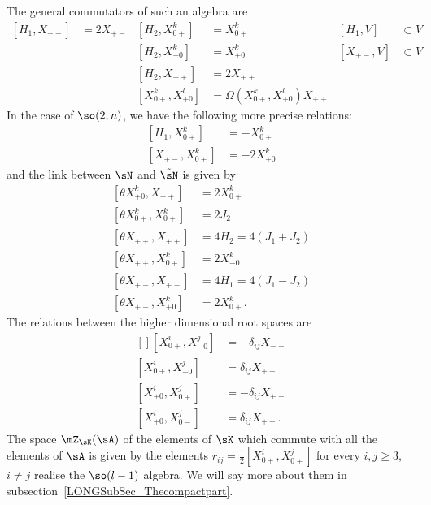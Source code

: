 The general commutators of such an algebra are
\begin{subequations}		\label{LONGsubEqsGenPySO}
\begin{align}
	[H_1,X_{+-}]		&=2X_{+-}	&	[H_2,X_{0+}^{k}]	&=X_{0+}^{k}				&[H_1,V]	&\subset V	\\
				&		&	[H_2,X_{+0}^{k}]	&=X_{+0}^{k}				&[X_{+-},V]	&\subset V	\\
				&		&	[H_2,X_{++}]		&=2X_{++}								\\
				&		&	[X_{0+}^k,X_{+0}^l]	&=\Omega(X_{0+}^k,X_{+0}^l)X_{++}
\end{align}
\end{subequations}
In the case of $\so(2,n)$, we have the following more precise relations:
\begin{subequations}		\label{LONGSubEqsPlusPresPySO}
	\begin{align}
		[H_1,X^k_{0+}]&=-X^k_{0+}\\
		[X_{+-},X^k_{0+}]&=-2X^k_{+0}
	\end{align}
\end{subequations}
and the link between $\sN$ and $\tilde\sN$ is given by
\begin{subequations}		\label{LONGSubEqsThethaPySO}
	\begin{align}
		[\theta X_{+0}^{k},X_{++}]	&=2X_{0+}^{k}\\
		[\theta X_{0+}^{k},X^k_{0+}]	&=2J_2\\
		[\theta X_{++},X_{++}]		&=4H_2=4(J_1+J_2)\\
		[\theta X_{++},X^{k}_{0+}]	&=2X_{-0}^{k}\\
		[\theta X_{+-},X_{+-}]		&=4H_1=4(J_1-J_2)\\
		[\theta X_{+-},X^{k}_{+0}]	&=2X_{0+}^{k}.
	\end{align}
\end{subequations}
The relations between the higher dimensional root spaces are
\begin{equation}
	\begin{aligned}[]
		[X_{0+}^i,X_{-0}^j]&=-\delta_{ij}X_{-+}\\
		[X_{0+}^i,X_{+0}^j]&=\delta_{ij}X_{++}\\
		[X_{+0}^i,X_{0+}^j]&=-\delta_{ij}X_{++}\\
		[X_{+0}^i,X_{0-}^j]&=\delta_{ij}X_{+-}.
	\end{aligned}
\end{equation}
%
%
The space $\mZ_{\sK}(\sA)$ of the elements of $\sK$ which commute with all the elements of $\sA$ is given by the elements $r_{ij}=\frac{ 1 }{2}[X_{0+}^i,X_{0+}^j]$ for every $i,j\geq 3$, $i\neq j$ realise the $\so(l-1)$ algebra. We will say more about them in subsection~\ref{LONGSubSec_Thecompactpart}.


